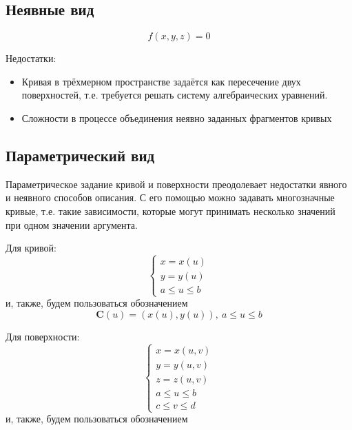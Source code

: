 \documentclass{bmstu}
\begin{document}
\subsection{Неявные вид}

\begin{equation*}
    f(x,y,z) = 0
\end{equation*}

Недостатки:
\begin{itemize}
    \item Кривая в трёхмерном пространстве задаётся как пересечение двух поверхностей, т.е. требуется решать систему алгебраических уравнений.
    \item Сложности в процессе объединения неявно заданных фрагментов кривых
\end{itemize}

\subsection{Параметрический вид}

Параметрическое  задание кривой и поверхности преодолевает недостатки явного и неявного способов описания. С его помощью можно задавать многозначные кривые, т.е. такие зависимости, которые могут принимать несколько значений при одном значении аргумента.

Для кривой:
\begin{equation}
    \begin{cases}
        x = x(u) \\
        y = y(u) \\
        a \le u \le b
    \end{cases}
\end{equation}
и, также, будем пользоваться обозначением
\begin{equation}
    \mathbf{C}(u) = (x(u), y(u)),~        a \le u \le b
\end{equation}

Для поверхности:
\begin{equation}
    \begin{cases}
        x = x(u, v)   \\
        y = y(u, v)   \\
        z = z(u, v)   \\
        a \le u \le b \\
        c \le v \le d
    \end{cases}
\end{equation}
и, также, будем пользоваться обозначением
\end{document}
